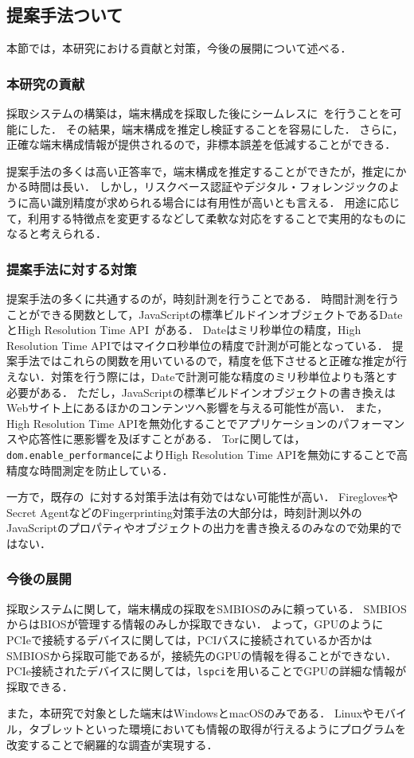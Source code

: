 \subsection{提案手法ついて}
本節では，本研究における貢献と対策，今後の展開について述べる．

\subsubsection{本研究の貢献}
採取システムの構築は，端末構成を採取した後にシームレスに\hfp~を行うことを可能にした．
その結果，端末構成を推定し検証することを容易にした．
さらに，正確な端末構成情報が提供されるので，非標本誤差を低減することができる．

提案手法の多くは高い正答率で，端末構成を推定することができたが，推定にかかる時間は長い．
しかし，リスクベース認証やデジタル・フォレンジックのように高い識別精度が求められる場合には有用性が高いとも言える．
用途に応じて，利用する特徴点を変更するなどして柔軟な対応をすることで実用的なものになると考えられる．

\subsubsection{提案手法に対する対策}
提案手法の多くに共通するのが，時刻計測を行うことである．
時間計測を行うことができる関数として，JavaScriptの標準ビルドインオブジェクトであるDateとHigh Resolution Time API~\cite{high_res_time}がある．
Dateはミリ秒単位の精度，High Resolution Time APIではマイクロ秒単位の精度で計測が可能となっている．
提案手法ではこれらの関数を用いているので，精度を低下させると正確な推定が行えない．対策を行う際には，Dateで計測可能な精度のミリ秒単位よりも落とす必要がある．
ただし，JavaScriptの標準ビルドインオブジェクトの書き換えはWebサイト上にあるほかのコンテンツへ影響を与える可能性が高い．
また，High Resolution Time APIを無効化することでアプリケーションのパフォーマンスや応答性に悪影響を及ぼすことがある．
Torに関しては，\texttt{dom.enable\_performance}によりHigh Resolution Time APIを無効にすることで高精度な時間測定を防止している．

一方で，既存の\fp~に対する対策手法は有効ではない可能性が高い．
FireglovesやSecret AgentなどのFingerprinting対策手法の大部分は，時刻計測以外のJavaScriptのプロパティやオブジェクトの出力を書き換えるのみなので効果的ではない．

\subsubsection{今後の展開}
採取システムに関して，端末構成の採取をSMBIOSのみに頼っている．
SMBIOSからはBIOSが管理する情報のみしか採取できない．
よって，GPUのようにPCIeで接続するデバイスに関しては，PCIバスに接続されているか否かはSMBIOSから採取可能であるが，接続先のGPUの情報を得ることができない．
PCIe接続されたデバイスに関しては，\texttt{lspci}を用いることでGPUの詳細な情報が採取できる．

また，本研究で対象とした端末はWindowsとmacOSのみである．
Linuxやモバイル，タブレットといった環境においても情報の取得が行えるようにプログラムを改変することで網羅的な調査が実現する．
